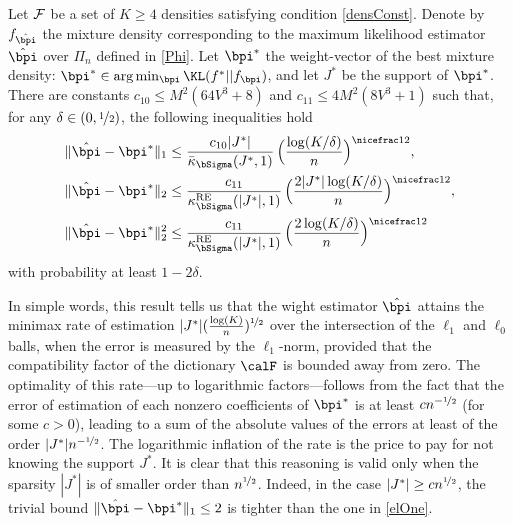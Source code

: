 \begin{proposition}\label{prop:1}
Let $\cal F$ be a set of $K\ge 4$ densities satisfying condition \eqref{densConst}.
Denote by $f_{\hat\bpi}$ the mixture density corresponding to the maximum likelihood
estimator $\hat\bpi$ over $\Pi_n$ defined in \eqref{Phi}. Let $\bpi^*$ the weight-vector
of the best mixture density: $\bpi^*\in\text{\rm arg}\min_{\bpi} \KL(f^*||f_{\bpi})$,
and let $J^*$ be the support of $\bpi^*$. There are constants $c_{10}\le M^2(64V^3+8)$
and $c_{11}\le 4M^2(8V^3+1)$ such that, for any
$\delta \in (0,\nicefrac12)$, the following  inequalities hold
\begin{align}
 \|\hat\bpi - \bpi^*\|_1
			&\leq  \frac{c_{10}|J^*|}{\bar\kappa_{\bSigma}(J^*,1)}\,\Big(\frac{\log(K/\delta)}{n}\Big)^{\nicefrac12},
					\label{elOne}\\
\|\hat\bpi - \bpi^*\|_2
			&\leq  \frac{c_{11}}{\kappa^{\rm RE}_{\bSigma}(|J^*|,1)}\,\Big(\frac{2|J^*|\log(K/\delta)}{n}\Big)^{\nicefrac12},
					\label{euclOne}\\		
\|\hat\bpi - \bpi^*\|_2^2
			&\leq  \frac{c_{11}}{\kappa^{\rm RE}_{\bSigma}(|J^*|,1)}\,\Big(\frac{2\log(K/\delta)}{n}\Big)^{\nicefrac12}
			\label{euclTwo}
\end{align}
with probability at least $1-2\delta$.
\end{proposition}


In simple words, this result tells us that the wight estimator $\hat\bpi$  attains the
minimax rate of estimation $|J^* |(\frac{\log(K)}{n})^{\nicefrac12}$ over the intersection of the
$\ell_1$ and $\ell_0$ balls, when the error is measured by the $\ell_1$-norm, provided
that the compatibility factor of the dictionary $\calF$ is bounded away from zero.
The optimality of this rate---up to logarithmic factors---follows from the fact that the
error of estimation of each nonzero coefficients of $\bpi^*$ is at least $cn^{-\nicefrac12}$ (for
some $c>0$), leading to a sum of the absolute values of the errors at least of the order
$|J^*|n^{-\nicefrac12}$. The logarithmic inflation of the rate is the price to pay for not knowing
the support $J^*$. It is clear that this reasoning is valid only when the sparsity
$|J^*|$ is of smaller order than $n^{\nicefrac12}$. Indeed, in the case $|J^*|\ge c n^{\nicefrac12}$,
the trivial bound $\|\hat\bpi-\bpi^*\|_1\le 2$ is tighter than the one in \eqref{elOne}.

